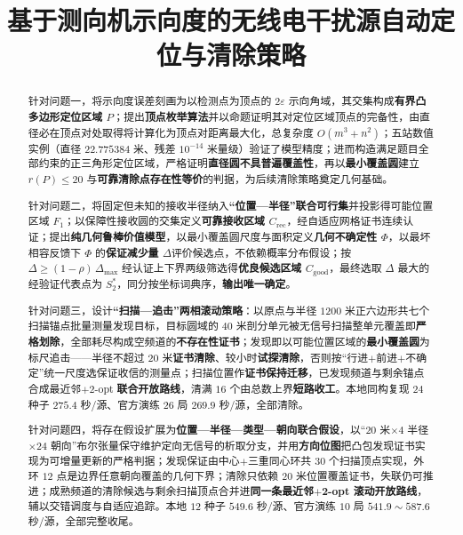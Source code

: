 \documentclass[withoutpreface]{cumcmthesis}
\title{基于测向机示向度的无线电干扰源自动定位与清除策略}
\begin{document}
\maketitle

\begin{abstract}
    针对问题一，将示向度误差刻画为以检测点为顶点的 $2\varepsilon$ 示向角域，其交集构成\textbf{有界凸多边形定位区域 $P$}；提出\textbf{顶点枚举算法}并以命题证明其对定位区域顶点的完备性，由直径必在顶点对处取得将计算化为顶点对距离最大化，总复杂度 $O(m^3+n^2)$；五站数值实例（直径 $22.775384$ 米、残差 $10^{-14}$ 米量级）验证了模型精度；进而构造满足题目全部约束的正三角形定位区域，严格证明\textbf{直径圆不具普遍覆盖性}，再以\textbf{最小覆盖圆}建立 $r(P)\le20$ 与\textbf{可靠清除点存在性等价}的判据，为后续清除策略奠定几何基础。

    针对问题二，将固定但未知的接收半径纳入\textbf{“位置—半径”联合可行集}并投影得可能位置区域 $F_1$；以保障性接收圆的交集定义\textbf{可靠接收区域 $C_{\mathrm{rec}}$}，经自适应网格证书连续认证；提出\textbf{纯几何鲁棒价值模型}，以最小覆盖圆尺度与面积定义\textbf{几何不确定性 $\Phi$}，以最坏相容反馈下 $\Phi$ 的\textbf{保证减少量 $\Delta$}评价候选点，不依赖概率分布假设；按 $\Delta\ge(1-\rho)\,\Delta_{\max}$ 经认证上下界两级筛选得\textbf{优良候选区域 $C_{\mathrm{good}}$}，最终选取 $\Delta$ 最大的经验证代表点为 $S_2^*$，同分按坐标词典序，\textbf{输出唯一确定}。

    针对问题三，设计\textbf{“扫描—追击”两相滚动策略}：以原点与半径 $1200$ 米正六边形共七个扫描锚点批量测量发现目标，目标圆域的 $40$ 米剖分单元被无信号扫描整单元覆盖即\textbf{严格划除}，全部耗尽构成空频道的\textbf{不存在性证书}；发现即以可能位置区域的\textbf{最小覆盖圆}为标尺追击——半径不超过 $20$ 米\textbf{证书清除}、较小时\textbf{试探清除}，否则按“行进$+$前进$+$不确定”统一尺度选保证收信的测量点；扫描位置作\textbf{证书保持迁移}，已发现频道与剩余锚点合成最近邻$+$2-opt \textbf{联合开放路线}，清满 $16$ 个由总数上界\textbf{短路收工}。本地同构复现 $24$ 种子 $275.4$ 秒/源、官方演练 $26$ 局 $269.9$ 秒/源，全部清除。

    针对问题四，将存在假设扩展为\textbf{位置—半径—类型—朝向联合假设}，以“$20$ 米$\times4$ 半径$\times24$ 朝向”布尔张量保守维护定向无信号的析取分支，并用\textbf{方向位图}把凸包发现证书实现为可增量更新的严格判据；发现保证由中心$+$三重同心环共 $30$ 个扫描顶点实现，外环 $12$ 点是边界任意朝向覆盖的几何下界；清除只依赖 $20$ 米位置覆盖证书，失联仍可推进；成熟频道的清除候选与剩余扫描顶点合并进\textbf{同一条最近邻$+$2-opt 滚动开放路线}，辅以交错调度与自适应追踪。本地 $12$ 种子 $549.6$ 秒/源、官方演练 $10$ 局 $541.9\sim587.6$ 秒/源，全部完整收尾。

\end{abstract}
\end{document}
